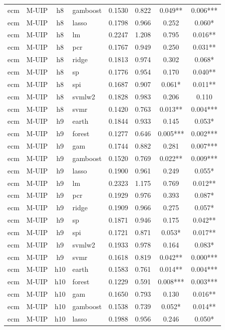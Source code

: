 \begin{ThreePartTable}
\begin{longtable}[t]{llclcccc}
ecm & M-UIP & h8 & gamboost & 0.1530 & 0.822 & 0.049** & 0.006***\\
ecm & M-UIP & h8 & lasso & 0.1798 & 0.966 & 0.252 & 0.060*\\
ecm & M-UIP & h8 & lm & 0.2247 & 1.208 & 0.795 & 0.016**\\
ecm & M-UIP & h8 & pcr & 0.1767 & 0.949 & 0.250 & 0.031**\\
ecm & M-UIP & h8 & ridge & 0.1813 & 0.974 & 0.302 & 0.068*\\
ecm & M-UIP & h8 & sp & 0.1776 & 0.954 & 0.170 & 0.040**\\
ecm & M-UIP & h8 & spi & 0.1687 & 0.907 & 0.061* & 0.011**\\
ecm & M-UIP & h8 & svmlw2 & 0.1828 & 0.983 & 0.206 & 0.110\\
ecm & M-UIP & h8 & svmr & 0.1420 & 0.763 & 0.013** & 0.004***\\
\addlinespace
ecm & M-UIP & h9 & earth & 0.1844 & 0.933 & 0.145 & 0.053*\\
ecm & M-UIP & h9 & forest & 0.1277 & 0.646 & 0.005*** & 0.002***\\
ecm & M-UIP & h9 & gam & 0.1744 & 0.882 & 0.281 & 0.007***\\
ecm & M-UIP & h9 & gamboost & 0.1520 & 0.769 & 0.022** & 0.009***\\
ecm & M-UIP & h9 & lasso & 0.1900 & 0.961 & 0.249 & 0.055*\\
ecm & M-UIP & h9 & lm & 0.2323 & 1.175 & 0.769 & 0.012**\\
ecm & M-UIP & h9 & pcr & 0.1929 & 0.976 & 0.393 & 0.087*\\
ecm & M-UIP & h9 & ridge & 0.1909 & 0.966 & 0.275 & 0.057*\\
ecm & M-UIP & h9 & sp & 0.1871 & 0.946 & 0.175 & 0.042**\\
ecm & M-UIP & h9 & spi & 0.1721 & 0.871 & 0.053* & 0.017**\\
ecm & M-UIP & h9 & svmlw2 & 0.1933 & 0.978 & 0.164 & 0.083*\\
ecm & M-UIP & h9 & svmr & 0.1618 & 0.819 & 0.042** & 0.000***\\
\addlinespace
ecm & M-UIP & h10 & earth & 0.1583 & 0.761 & 0.014** & 0.004***\\
ecm & M-UIP & h10 & forest & 0.1229 & 0.591 & 0.008*** & 0.003***\\
ecm & M-UIP & h10 & gam & 0.1650 & 0.793 & 0.130 & 0.016**\\
ecm & M-UIP & h10 & gamboost & 0.1538 & 0.739 & 0.052* & 0.014**\\
ecm & M-UIP & h10 & lasso & 0.1988 & 0.956 & 0.246 & 0.050*\\

\end{longtable}
\end{ThreePartTable}
